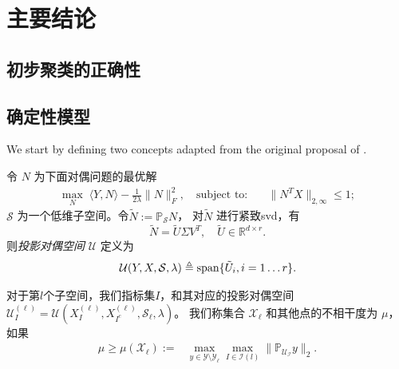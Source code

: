 \documentclass{ctexart}
\begin{document}
\section{主要结论}\label{sec:main}
\subsection{初步聚类的正确性}

\subsection{确定性模型}
We start by defining two concepts adapted from the original proposal of \cite{soltanolkotabi2011geometric}.
\begin{definition}[投影对偶空间]\label{def:proj_dual_direction}
  令 $N$ 为下面对偶问题的最优解
  \begin{align*}
    \max_{N} \; \langle Y, N \rangle - \frac{1}{2\lambda}\| N
    \|_F^2,\quad\text{subject to:}\quad &\|N^T X\|_{2, \infty} \leq 1;
  \end{align*}
  $\mathcal{S}$ 为一个低维子空间。令$ \tilde{N} := \mathbb{P}_{\mathcal{S}} N$，
  对$\tilde{N}$ 进行紧致svd，有
  $$ \tilde{N} = \tilde{U} \Sigma V^T, \quad \tilde{U} \in \mathbb{R}^{d \times r}. $$
  则{\em 投影对偶空间} $\mathcal{U}$ 定义为
  $$\mathcal{U}(Y,X,\mathcal{S},\lambda)\triangleq \mathrm{span} \{ \tilde{U}_i, i = 1\dots r \}.$$
\end{definition}


\begin{definition}[投影子空间的非相干性]\label{def:incoherence}
  对于第$l$个子空间，我们指标集$I$，和其对应的投影对偶空间
  $\mathcal{U}_I^{(\ell)}=\mathcal{U}(X_I^{(\ell)},X_{I^c}^{(\ell)},\mathcal{S}_{\ell},\lambda)$。
  我们称集合 $\mathcal{X}_{\ell}$ 和其他点的不相干度为 $\mu$，如果
  \begin{align*}
    \mu\geq \mu(\mathcal{X}_{\ell}) := &\max_{y\in \mathcal{Y}\setminus \mathcal{Y}_{\ell}}
    \max_{I \in \mathcal{I}(l)} \|\mathbb{P}_{\mathcal{U_I}} y\|_2.
  \end{align*}
\end{definition}
%
\end{document}
